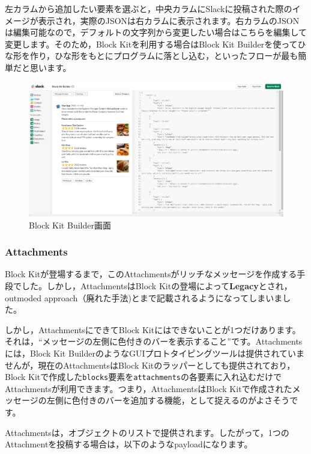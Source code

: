 \documentclass[uplatex,a4j]{jsarticle}
\begin{document}
左カラムから追加したい要素を選ぶと，中央カラムにSlackに投稿された際のイメージが表示され，実際のJSONは右カラムに表示されます。右カラムのJSONは編集可能なので，デフォルトの文字列から変更したい場合はこちらを編集して変更します。そのため，Block Kitを利用する場合はBlock Kit Builderを使ってひな形を作り，ひな形をもとにプログラムに落とし込む，といったフローが最も簡単だと思います。

\begin{figure}[H]
 \centering
 \includegraphics[keepaspectratio, scale=0.35]{images/block_kit_builder.png}
 \caption{Block Kit Builder画面}
 \label{fig:block_kit_builder}
\end{figure}

\subsubsection{Attachments}

Block Kitが登場するまで，このAttachmentsがリッチなメッセージを作成する手段でした。しかし，AttachmentsはBlock Kitの登場によって\textbf{Legacy}とされ，outmoded approach（廃れた手法)とまで記載されるようになってしまいました。

しかし，AttachmentsにできてBlock Kitにはできないことが1つだけあります。それは，``メッセージの左側に色付きのバーを表示すること''です。Attachmentsには，Block Kit BuilderのようなGUIプロトタイピングツールは提供されていませんが，現在のAttachmentsはBlock Kitのラッパーとしても提供されており，Block Kitで作成した\verb|blocks|要素を\verb|attachments|の各要素に入れ込むだけでAttachmentsが利用できます。つまり，AttachmentsはBlock Kitで作成されたメッセージの左側に色付きのバーを追加する機能，として捉えるのがよさそうです。

Attachmentsは，オブジェクトのリストで提供されます。したがって，1つのAttachmentを投稿する場合は，以下のようなpayloadになります。
\end{document}
